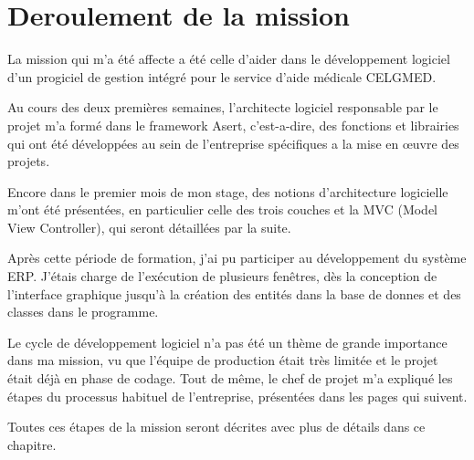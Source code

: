 \chapter{Deroulement de la mission}

La mission qui m'a été affecte a été celle d'aider dans le développement logiciel d'un progiciel de gestion intégré pour le service d'aide médicale CELGMED. 

Au cours des deux premières semaines, l'architecte logiciel responsable par le projet m'a formé dans le framework Asert, c'est-a-dire, des fonctions et librairies qui ont été développées au sein de l'entreprise spécifiques a la mise en œuvre des projets.

Encore dans le premier mois de mon stage, des notions d'architecture logicielle m'ont été présentées, en particulier celle des trois couches et la MVC (Model View Controller), qui seront détaillées par la suite.

Après cette période de formation, j'ai pu participer au développement du système \gls{ERP}. J'étais charge de l'exécution de plusieurs fenêtres, dès la conception de l'interface graphique jusqu'à la création des entités dans la base de donnes et des classes dans le programme.

Le cycle de développement logiciel n'a pas été un thème de grande importance dans ma mission, vu que l'équipe de production était très limitée et le projet était déjà en phase de codage. Tout de même, le chef de projet m'a expliqué les étapes du processus habituel de l'entreprise, présentées dans les pages qui suivent.

Toutes ces étapes de la mission seront décrites avec plus de détails dans ce chapitre.  




